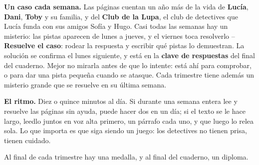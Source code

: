 \textbf{Un caso cada semana.} Las páginas cuentan un año más de la vida
de \textbf{Lucía}, \textbf{Dani}, \textbf{Toby} y su familia, y del
\textbf{Club de la Lupa}, el club de detectives que Lucía funda con sus
amigos Sofía y Hugo. Casi todas las semanas hay un misterio: las pistas
aparecen de lunes a jueves, y el viernes toca resolverlo --
\textbf{Resuelve el caso}: rodear la respuesta y escribir qué pistas lo
demuestran. La solución se confirma el lunes siguiente, y está en la
\textbf{clave de respuestas} del final del cuaderno. Mejor no mirarla
antes de que lo intente: está ahí para comprobar, o para dar una pista
pequeña cuando se atasque. Cada trimestre tiene además un misterio
grande que se resuelve en su última semana.

\textbf{El ritmo.} Diez o quince minutos al día. Si durante una semana
entera lee y resuelve las páginas sin ayuda, puede hacer dos en un día;
si el texto se le hace largo, leedlo juntos en voz alta primero, un
párrafo cada uno, y que luego lo relea sola. Lo que importa es que
siga siendo un juego: los detectives no tienen prisa, tienen cuidado.

Al final de cada trimestre hay una medalla, y al final del cuaderno, un
diploma.
\newpage
